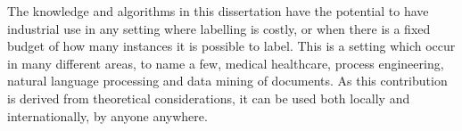 \begin{impactstatement}








The knowledge and algorithms in this dissertation have the potential to have
industrial use in any setting where labelling is costly, or when there is a
fixed budget of how many instances it is possible to label. This is a setting
which occur in many different areas, to name a few, medical healthcare, process
engineering, natural language processing and data mining of documents. As
this contribution is derived from theoretical considerations, it can be used
both locally and internationally, by anyone anywhere.


\end{impactstatement}
